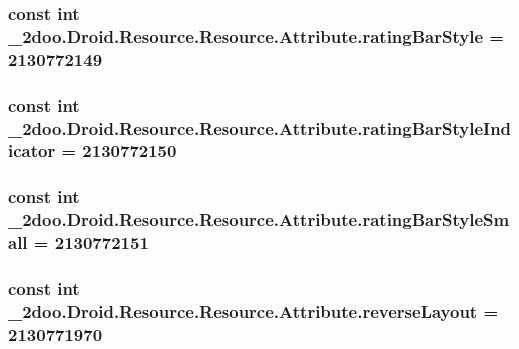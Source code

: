 \hypertarget{class__2doo_1_1_droid_1_1_resource_1_1_attribute_0e5a1138e4a76e14f7dd2e7aadfba87e}{
\subsubsection[{ratingBarStyle}]{\setlength{\rightskip}{0pt plus 5cm}const int \_\-2doo.Droid.Resource.Resource.Attribute.ratingBarStyle = 2130772149}}
\label{class__2doo_1_1_droid_1_1_resource_1_1_attribute_0e5a1138e4a76e14f7dd2e7aadfba87e}


\hypertarget{class__2doo_1_1_droid_1_1_resource_1_1_attribute_b03105095dd0fcee9bf3e451ca610351}{
\subsubsection[{ratingBarStyleIndicator}]{\setlength{\rightskip}{0pt plus 5cm}const int \_\-2doo.Droid.Resource.Resource.Attribute.ratingBarStyleIndicator = 2130772150}}
\label{class__2doo_1_1_droid_1_1_resource_1_1_attribute_b03105095dd0fcee9bf3e451ca610351}


\hypertarget{class__2doo_1_1_droid_1_1_resource_1_1_attribute_e7d7954fa11be0448f793183432e08e6}{
\subsubsection[{ratingBarStyleSmall}]{\setlength{\rightskip}{0pt plus 5cm}const int \_\-2doo.Droid.Resource.Resource.Attribute.ratingBarStyleSmall = 2130772151}}
\label{class__2doo_1_1_droid_1_1_resource_1_1_attribute_e7d7954fa11be0448f793183432e08e6}


\hypertarget{class__2doo_1_1_droid_1_1_resource_1_1_attribute_de701e5773d7121cd7ede8215f79bc74}{
\subsubsection[{reverseLayout}]{\setlength{\rightskip}{0pt plus 5cm}const int \_\-2doo.Droid.Resource.Resource.Attribute.reverseLayout = 2130771970}}
\label{class__2doo_1_1_droid_1_1_resource_1_1_attribute_de701e5773d7121cd7ede8215f79bc74}


